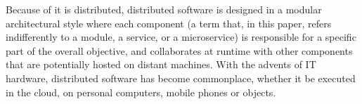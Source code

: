 %

Because of it is distributed,
distributed software is designed in a modular architectural style
where each component (a term that, in this paper, refers indifferently
to a module, a service, or a microservice) is responsible for a
specific part of the overall objective, and collaborates at runtime
with other components that are potentially hosted on distant
machines. With the advents of IT hardware, distributed software has
become commonplace, whether it be executed in the cloud, on personal
computers, mobile phones or objects.

